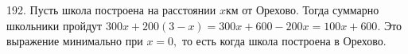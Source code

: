 192. Пусть школа построена на расстоянии $x$км от Орехово. Тогда суммарно школьники пройдут $300x+200(3-x)=300x+600-200x=100x+600.$ Это выражение минимально при $x=0,$ то есть когда школа построена в Орехово.\\
